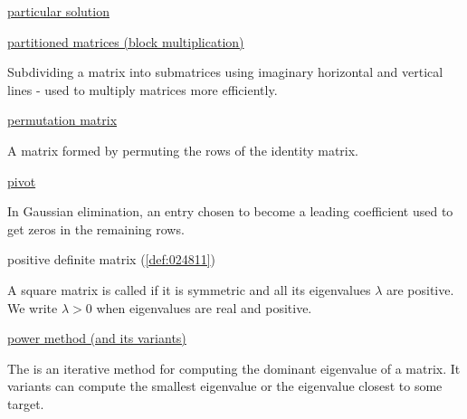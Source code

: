 \documentclass{ximera}
\begin{document}
\href{https://ximera.osu.edu/linearalgebradzv3/LinearAlgebraInteractiveIntro/SYS-0050/main}{particular solution}

\href{https://ximera.osu.edu/linearalgebradzv3/LinearAlgebraInteractiveIntro/MAT-0023/main}{partitioned matrices (block multiplication)}
\begin{expandable}{}{}
    Subdividing a matrix into submatrices using imaginary horizontal and vertical lines - used to multiply matrices more efficiently.
\end{expandable}

\href{https://ximera.osu.edu/linearalgebradzv3/LinearAlgebraInteractiveIntro/MAT-0070/main}{permutation matrix}
\begin{expandable}{}{}
    A matrix formed by permuting the rows of the identity matrix.
\end{expandable}

\href{https://ximera.osu.edu/linearalgebradzv3/LinearAlgebraInteractiveIntro/SYS-0030/main}{pivot}
\begin{expandable}{}{}
    In Gaussian elimination, an entry chosen to become a leading coefficient used to get zeros in the remaining rows.
\end{expandable}

positive definite matrix (\ref{def:024811})
\begin{expandable}{}{}
    A square matrix is called  if it is symmetric and all its eigenvalues $\lambda$ are positive.  We write $\lambda>0$ when eigenvalues are real and positive.
\end{expandable}

\href{https://ximera.osu.edu/linearalgebradzv3/LinearAlgebraInteractiveIntro/EIG-0070/main}{power method (and its variants)}
\begin{expandable}{}{}
    The  is an iterative method for computing the dominant eigenvalue of a matrix. It variants can compute the smallest eigenvalue or the eigenvalue closest to some target.
\end{expandable}
\end{document}
